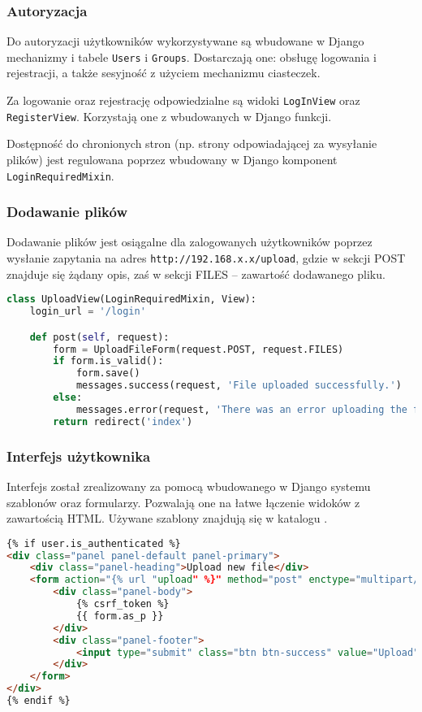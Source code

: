 \documentclass[10pt,a4paper]{article}
\begin{document}
\subsubsection{Autoryzacja}

Do autoryzacji użytkowników wykorzystywane są wbudowane w Django mechanizmy i tabele \texttt{Users}
i \texttt{Groups}. Dostarczają one: obsługę logowania i rejestracji, a także sesyjność z użyciem
mechanizmu ciasteczek.

Za logowanie oraz rejestrację odpowiedzialne są widoki \texttt{LogInView} oraz
\texttt{RegisterView}. Korzystają one z wbudowanych w Django funkcji.

Dostępność do chronionych stron (np. strony odpowiadającej za wysyłanie plików) jest regulowana
poprzez wbudowany w Django komponent \texttt{LoginRequiredMixin}.

\subsubsection{Dodawanie plików}

Dodawanie plików jest osiągalne dla zalogowanych użytkowników poprzez wysłanie zapytania
na adres \texttt{http://192.168.x.x/upload}, gdzie w sekcji POST znajduje się żądany opis,
zaś w sekcji FILES -- zawartość dodawanego pliku.

\begin{lstlisting}[language=python,caption=Widok odpowiedzialny za dodawanie pliku]
class UploadView(LoginRequiredMixin, View):
    login_url = '/login'

    def post(self, request):
        form = UploadFileForm(request.POST, request.FILES)
        if form.is_valid():
            form.save()
            messages.success(request, 'File uploaded successfully.')
        else:
            messages.error(request, 'There was an error uploading the file.')
        return redirect('index')
\end{lstlisting}

\subsubsection{Interfejs użytkownika}

Interfejs został zrealizowany za pomocą wbudowanego w Django systemu szablonów oraz
formularzy. Pozwalają one na łatwe łączenie widoków z zawartością HTML. Używane szablony
znajdują się w katalogu .

\begin{lstlisting}[language=html,caption=Przykład zastosowania szablonów i formularzy -- formularz dodawania plików]
{% if user.is_authenticated %}
<div class="panel panel-default panel-primary">
	<div class="panel-heading">Upload new file</div>
	<form action="{% url "upload" %}" method="post" enctype="multipart/form-data">
		<div class="panel-body">
			{% csrf_token %}
			{{ form.as_p }}
		</div>
		<div class="panel-footer">
			<input type="submit" class="btn btn-success" value="Upload" />
		</div>
	</form>
</div>
{% endif %}
\end{lstlisting}
\end{document}
